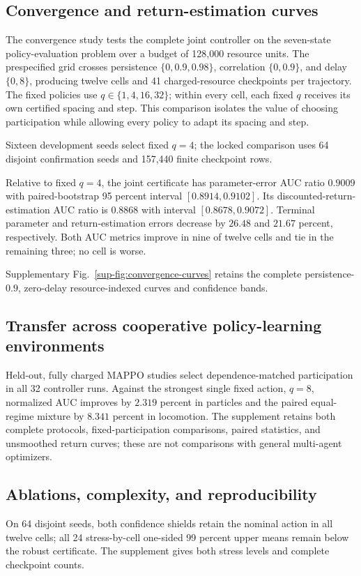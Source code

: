 \documentclass[journal]{IEEEtran}
\begin{document}
\subsection{Convergence and return-estimation curves}
The convergence study tests the complete joint controller on the seven-state policy-evaluation problem over a budget of 128,000 resource units.
The prespecified grid crosses persistence $\{0,0.9,0.98\}$, correlation $\{0,0.9\}$, and delay $\{0,8\}$, producing twelve cells and 41 charged-resource checkpoints per trajectory.
The fixed policies use $q\in\{1,4,16,32\}$; within every cell, each fixed $q$ receives its own certified spacing and step.
This comparison isolates the value of choosing participation while allowing every policy to adapt its spacing and step.

Sixteen development seeds select fixed $q=4$; the locked comparison uses 64 disjoint confirmation seeds and 157,440 finite checkpoint rows.

Relative to fixed $q=4$, the joint certificate has parameter-error AUC ratio $0.9009$ with paired-bootstrap 95 percent interval $[0.8914,0.9102]$.
Its discounted-return-estimation AUC ratio is $0.8868$ with interval $[0.8678,0.9072]$.
Terminal parameter and return-estimation errors decrease by $26.48$ and $21.67$ percent, respectively.
Both AUC metrics improve in nine of twelve cells and tie in the remaining three; no cell is worse.

Supplementary Fig.~\ref{sup-fig:convergence-curves} retains the complete persistence-$0.9$, zero-delay resource-indexed curves and confidence bands.

\subsection{Transfer across cooperative policy-learning environments}
Held-out, fully charged MAPPO studies select dependence-matched participation in all 32 controller runs.
Against the strongest single fixed action, $q=8$, normalized AUC improves by $2.319$ percent in particles and the paired equal-regime mixture by $8.341$ percent in locomotion.
The supplement retains both complete protocols, fixed-participation comparisons, paired statistics, and unsmoothed return curves; these are not comparisons with general multi-agent optimizers.

\subsection{Ablations, complexity, and reproducibility}
On 64 disjoint seeds, both confidence shields retain the nominal action in all twelve cells; all 24 stress-by-cell one-sided 99 percent upper means remain below the robust certificate.
The supplement gives both stress levels and complete checkpoint counts.
\end{document}
